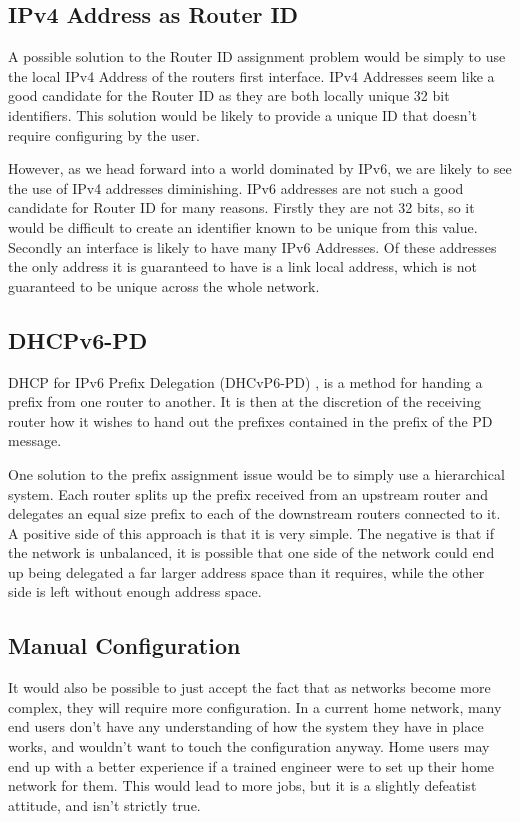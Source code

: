\documentclass[12pt]{report}
\begin{document}
\subsection{IPv4 Address as Router ID}
A possible solution to the Router ID assignment problem would be simply to use
the local IPv4 Address of the routers first interface. IPv4 Addresses seem like
a good candidate for the Router ID as they are both locally unique 32 bit
identifiers. This solution would be likely to provide a unique ID that doesn't
require configuring by the user.
 
However, as we head forward into a world dominated by IPv6, we are likely to
see the use of IPv4 addresses diminishing. IPv6 addresses are not such a good
candidate for Router ID for many reasons. Firstly they are not 32 bits, so it
would be difficult to create an identifier known to be unique from this value.
Secondly an interface is likely to have many IPv6 Addresses. Of these addresses
the only address it is guaranteed to have is a link local address, which is not
guaranteed to be unique across the whole network. 

\subsection{DHCPv6-PD}
DHCP for IPv6 Prefix Delegation (DHCvP6-PD) , is a method for handing a prefix from one router to
another. It is then at the discretion of the receiving router how it wishes to
hand out the prefixes contained in the prefix of the PD message. 

One solution to the prefix assignment issue would be to simply use a
hierarchical system. Each router splits up the prefix received from an upstream
router and delegates an equal size prefix to each of the downstream routers
connected to it. A positive side of this approach is that it is very simple.
The negative is that if the network is unbalanced, it is possible that one side
of the network could end up being delegated a far larger address space than it
requires, while the other side is left without enough address space.  

\subsection{Manual Configuration}
It would also be possible to just accept the fact that as networks become more
complex, they will require more configuration. In a current home network, many
end users don't have any understanding of how the system they have in place
works, and wouldn't want to touch the configuration anyway. Home users may end
up with a better experience if a trained engineer were to set up their home
network for them. This would lead to more jobs, but it is a slightly defeatist
attitude, and isn't strictly true. 
\end{document}
